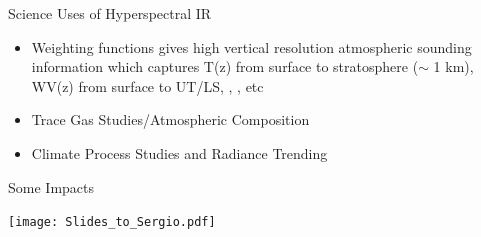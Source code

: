 \documentclass[10pt,t]{beamer}
\begin{document}
\begin{frame}{Science Uses of Hyperspectral IR}
\begin{itemize}
  \item Weighting functions gives high vertical resolution atmospheric sounding information which captures 
         T(z) from surface to stratosphere ($\sim$ 1 km), WV(z) from surface to UT/LS, \ozone, \cd, \methane etc
  \item Trace Gas Studies/Atmospheric Composition
  \item Climate Process Studies and Radiance Trending
  \end{itemize}
\end{frame}
\begin{frame}{Some Impacts}
\vspace{-0.35in}
\begin{center}
\texttt{[image: Slides\_to\_Sergio.pdf]}
\end{center}
\end{frame}
\end{document}
